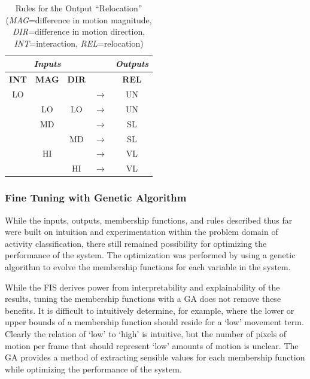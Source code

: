 \documentclass[12pt]{report}
\begin{document}
\begin{table}
\caption{Rules for the Output ``Relocation'' (\textit{MAG}=difference in motion magnitude, \textit{DIR}=difference in motion direction, \textit{INT}=interaction, \textit{REL}=relocation)}
\begin{center}
\begin{tabular}{ccccc}
\hline
\multicolumn{3}{c}{\textbf{\textit{Inputs}}} & & \textbf{\textit{Outputs}} \\
\hline
\hline
\textbf{INT} & \textbf{MAG} & \textbf{DIR} & & \textbf{REL}\\
\hline
LO &  &  & $\longrightarrow$ & UN \\
 & LO & LO & $\longrightarrow$ & UN \\
 & MD & & $\longrightarrow$ &  SL \\
 & & MD &$\longrightarrow$ &  SL \\
 & HI & & $\longrightarrow$ &  VL \\
 & & HI &$\longrightarrow$ &  VL \\
\hline
\end{tabular}
\label{relocateRules}
\end{center}
\end{table}

\subsubsection{Fine Tuning with Genetic Algorithm}
While the inputs, outputs, membership functions, and rules described thus far were built on intuition and experimentation within the problem domain of activity classification, there still remained possibility for optimizing the performance of the system. The optimization was performed by using a genetic algorithm to evolve the membership functions for each variable in the system. 

While the FIS derives power from interpretability and explainability of the results, tuning the membership functions with a GA does not remove these benefits. It is difficult to intuitively determine, for example, where the lower or upper bounds of a membership function should reside for a `low' movement term. Clearly the relation of `low' to `high' is intuitive, but the number of pixels of motion per frame that should represent `low' amounts of motion is unclear. The GA provides a method of extracting sensible values for each membership function while optimizing the performance of the system.
\end{document}
